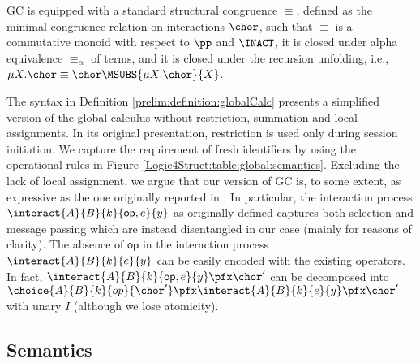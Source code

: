 \begin{definition}
GC is equipped with a standard structural
congruence $\equiv$, defined as the minimal congruence relation on
interactions $\chor$, such that $\equiv$ is a commutative monoid with
respect to $\pp$ and $\INACT$, it is closed under alpha equivalence
$\equiv_\alpha$ of terms, and it is closed under the recursion
unfolding, i.e., $ \mu X. \chor \equiv \chor \MSUBS{\mu X. \chor}{X}$.
\end{definition}

\begin{remark}
  \label{Logic4Struct:remark::one}
  The syntax in Definition \ref{prelim:definition:globalCalc} presents
  a simplified version of the global calculus without restriction,
  summation and local assignments. In its original presentation, restriction is used only during session
  initiation. We capture the requirement of fresh identifiers by using
  the operational rules in Figure \ref{Logic4Struct:table:global:semantics}.
  Excluding the lack of local assignment, we argue that our version of
  GC is, to some extent, as expressive as the one originally reported
  in \cite{carbone7scc}.  In particular, the interaction
  process $\interact{A}{B}{k}{\mathsf{op},e}{y}$  as originally defined
  captures both selection and message passing which are instead
  disentangled in our case (mainly for reasons of clarity). The absence
  of $\mathsf{op}$ in the interaction process
  $\interact{A}{B}{k}{e}{y}$ can be easily encoded with the existing
  operators. In fact, $\interact{A}{B}{k}{\mathsf{op},e}{y} \pfx
  \chor'$ can be decomposed into $\choice{A}{B}{k}{op}{\chor'} \pfx
  \interact{A}{B}{k}{e}{y} \pfx \chor'$ with unary $I$ (although we
  lose atomicity).
\end{remark}



\subsection{Semantics}

